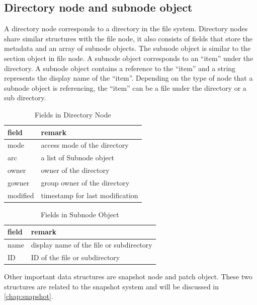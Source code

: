 \subsection{Directory node and subnode object}

     A directory node corresponds to a directory in the file system. Directory nodes share similar structures with the file node, it also consists of fields that store the metadata and an array of subnode objects. The subnode object is similar to the section object in file node. A subnode object corresponds to an ``item'' under the directory. A subnode object contains a reference to the ``item'' and a string represents the display name of the ``item''. Depending on the type of node that a subnode object is referencing, the ``item'' can be a file under the directory or a sub directory.

\begin{table}
\caption{Fields in Directory Node}
\label{tab:dir_fields}
\begin{center}
\begin{tabular}{ll}
\toprule
field & remark\\
\midrule
mode & access mode of the directory\\
arc & a list of Subnode object\\
owner & owner of the directory\\
gowner & group owner of the directory\\
modified & timestamp for last modification\\
\bottomrule
\end{tabular}
\end{center}
\end{table}

\begin{table}
\caption{Fields in Subnode Object}
\label{tab:subnode_fields}
\begin{center}
\begin{tabular}{ll}
\toprule
field & remark\\
\midrule
name & display name of the file or subdirectory\\
ID & ID of the file or subdirectory\\
\bottomrule
\end{tabular}
\end{center}
\end{table}

    Other important data structures are snapshot node and patch object. These two structures are related to the snapshot system and will be discussed in \cref{chap:snapshot}.

